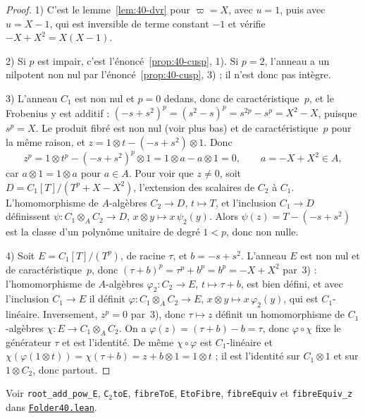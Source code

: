 \begin{proof}
1) C'est le lemme~\ref{lem:40-dvr} pour $\varpi = X$, avec $u = 1$, puis avec $u = X - 1$, qui est inversible de terme constant $-1$ et vérifie $-X + X^2 = X(X - 1)$.

2) Si $p$ est impair, c'est l'énoncé~\ref{prop:40-cusp}, 1). Si $p = 2$, l'anneau a un nilpotent non nul par l'énoncé~\ref{prop:40-cusp}, 3) ; il n'est donc pas intègre.

3) L'anneau $C_1$ est non nul et $p = 0$ dedans, donc de caractéristique~$p$, et le Frobenius y est additif : $(-s + s^2)^p = (s^2 - s)^p = s^{2p} - s^p = X^2 - X$, puisque $s^p = X$. Le produit fibré est non nul (voir plus bas) et de caractéristique~$p$ pour la même raison, et $z = 1 \otimes t - (-s + s^2) \otimes 1$. Donc
\[ z^p = 1 \otimes t^p - (-s + s^2)^p \otimes 1 = 1 \otimes a - a \otimes 1 = 0, \qquad a = -X + X^2 \in A, \]
car $a \otimes 1 = 1 \otimes a$ pour $a \in A$. Pour voir que $z \neq 0$, soit $D = C_1[T]/(T^p + X - X^2)$, l'extension des scalaires de $C_2$ à $C_1$. L'homomorphisme de $A$-algèbres $C_2 \to D$, $t \mapsto T$, et l'inclusion $C_1 \to D$ définissent $\psi : C_1 \otimes_A C_2 \to D$, $x \otimes y \mapsto x\,\psi_2(y)$. Alors $\psi(z) = T - (-s + s^2)$ est la classe d'un polynôme unitaire de degré $1 < p$, donc non nulle.

4) Soit $E = C_1[T]/(T^p)$, de racine $\tau$, et $b = -s + s^2$. L'anneau $E$ est non nul et de caractéristique~$p$, donc $(\tau + b)^p = \tau^p + b^p = b^p = -X + X^2$ par~3) : l'homomorphisme de $A$-algèbres $\varphi_2 : C_2 \to E$, $t \mapsto \tau + b$, est bien défini, et avec l'inclusion $C_1 \to E$ il définit $\varphi : C_1 \otimes_A C_2 \to E$, $x \otimes y \mapsto x\,\varphi_2(y)$, qui est $C_1$-linéaire. Inversement, $z^p = 0$ par~3), donc $\tau \mapsto z$ définit un homomorphisme de $C_1$-algèbres $\chi : E \to C_1 \otimes_A C_2$. On a $\varphi(z) = (\tau + b) - b = \tau$, donc $\varphi \circ \chi$ fixe le générateur $\tau$ et est l'identité. De même $\chi \circ \varphi$ est $C_1$-linéaire et $\chi(\varphi(1 \otimes t)) = \chi(\tau + b) = z + b \otimes 1 = 1 \otimes t$ ; il est l'identité sur $C_1 \otimes 1$ et sur $1 \otimes C_2$, donc partout.
\end{proof}

\begingroup\raggedright
\noindent Voir \texttt{root\_add\_pow\_E}, \texttt{C$_2$toE}, \texttt{fibreToE}, \texttt{EtoFibre}, \texttt{fibreEquiv} et \texttt{fibreEquiv\_z} dans \href{\leanblob/AlgebraicGeometry/Folder40.lean}{\texttt{Folder40.\allowbreak{}lean}}.\par\endgroup

